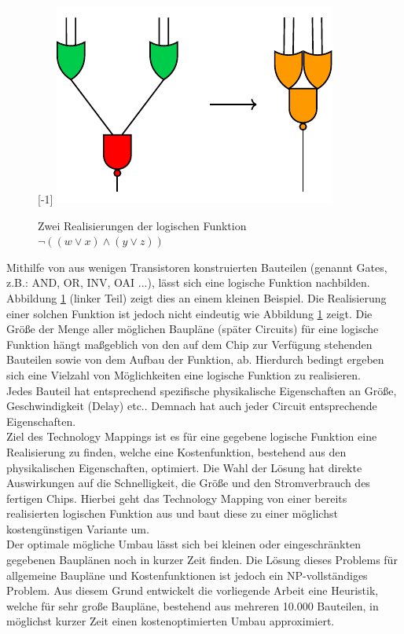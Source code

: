 \documentclass[11pt, a4paper, german]{article}
\newcommand{\TM}{Technology  Mapping }
\begin{document}
\begin{figure}
	\scalebox{1}[-1]{
		\includegraphics[]{pictures/compiled/einfBsp}
	}
		\caption{Zwei Realisierungen der logischen Funktion $\neg((w\lor x) \land (y \lor z))$}
		\label{bild:einfbsp}
\end{figure}
Mithilfe von aus wenigen Transistoren konstruierten Bauteilen (genannt Gates, z.B.: AND, OR, INV, OAI ...), lässt sich eine logische Funktion nachbilden. Abbildung \ref{bild:einfbsp} (linker Teil) zeigt dies an einem kleinen Beispiel.  Die Realisierung einer solchen Funktion ist jedoch nicht eindeutig wie Abbildung \ref{bild:einfbsp}  zeigt. 
Die Größe der Menge aller möglichen Baupläne (später Circuits) für eine logische Funktion hängt maßgeblich von den auf dem Chip zur Verfügung stehenden Bauteilen sowie von dem Aufbau der Funktion, ab. Hierdurch bedingt ergeben sich eine Vielzahl von  Möglichkeiten eine logische Funktion zu realisieren.\\
 Jedes Bauteil hat entsprechend spezifische physikalische Eigenschaften an Größe, Geschwindigkeit (Delay) etc.. Demnach hat auch jeder Circuit entsprechende Eigenschaften. \\
Ziel des Technology Mappings ist es für eine gegebene logische Funktion eine Realisierung zu finden, welche eine Kostenfunktion, bestehend aus den physikalischen Eigenschaften, optimiert. Die Wahl der Lösung hat direkte Auswirkungen auf die  Schnelligkeit, die Größe und den Stromverbrauch des fertigen Chips. Hierbei geht das \TM von einer bereits realisierten logischen Funktion aus und baut diese zu einer möglichst kostengünstigen Variante um. \\
Der optimale mögliche Umbau lässt sich bei kleinen oder eingeschränkten gegebenen Bauplänen noch in kurzer Zeit finden. Die Lösung dieses Problems für allgemeine Baupläne und Kostenfunktionen ist jedoch ein NP-vollständiges Problem. Aus diesem Grund entwickelt die vorliegende Arbeit eine Heuristik, welche für sehr große Baupläne, bestehend aus mehreren 10.000 Bauteilen, in möglichst kurzer Zeit einen kostenoptimierten Umbau approximiert.\\
\end{document}
